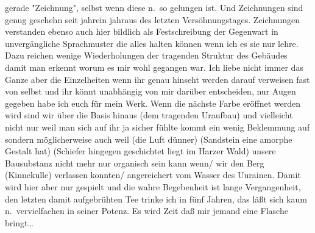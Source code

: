 \documentclass[
]{article}
\begin{document}
gerade "Zeichnung", selbst wenn diese n.~so gelungen ist. Und
Zeichnungen sind genug geschehn seit jahrein jahraus des letzten
Versöhnungstages. Zeichnungen verstanden ebenso auch hier bildlich als
Festschreibung der Gegenwart in unvergängliche Sprachmuster die alles
halten können wenn ich es sie nur lehre. Dazu reichen wenige
Wiederholungen der tragenden Struktur des Gebäudes damit man erkennt
worum es mir wohl gegangen war. Ich liebe nicht immer das Ganze aber die
Einzelheiten wenn ihr genau hinseht werden darauf verweisen fast von
selbst und ihr könnt unabhängig von mir darüber entscheiden, nur Augen
gegeben habe ich euch für mein Werk. Wenn die nächste Farbe eröffnet
werden wird sind wir über die Basis hinaus (dem tragenden Uraufbau) und
vielleicht nicht nur weil man sich auf ihr ja sicher fühlte kommt ein
wenig Beklemmung auf sondern möglicherweise auch weil (die Luft dünner)
(Sandstein eine amorphe Gestalt hat) (Schiefer hingegen geschichtet
liegt im Harzer Wald) unsere Bausubstanz nicht mehr nur organisch sein
kann wenn/ wir den Berg (Kinnekulle) verlassen konnten/ angereichert vom
Wasser des Uurainen. Damit wird hier aber nur gespielt und die wahre
Begebenheit ist lange Vergangenheit, den letzten damit aufgebrühten Tee
trinke ich in fünf Jahren, das läßt sich kaum n.~vervielfachen in seiner
Potenz. Es wird Zeit daß mir jemand eine Flasche bringt\ldots{}
\end{document}
